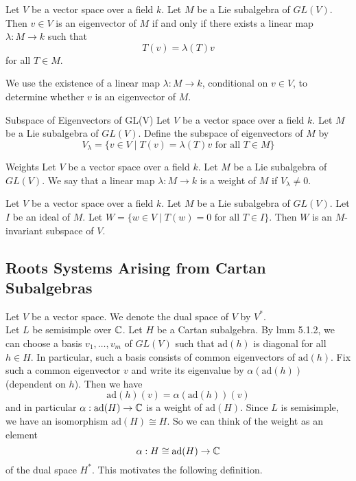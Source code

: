 \documentclass[a4paper]{article}
\begin{document}
\begin{lmm}{}{} Let $V$ be a vector space over a field $k$. Let $M$ be a Lie subalgebra of $GL(V)$. Then $v\in V$ is an eigenvector of $M$ if and only if there exists a linear map $\lambda:M\to k$ such that $$T(v)=\lambda(T)v$$ for all $T\in M$. 
\end{lmm}

We use the existence of a linear map $\lambda:M\to k$, conditional on $v\in V$, to determine whether $v$ is an eigenvector of $M$. 

\begin{defn}{Subspace of Eigenvectors of GL(V)}{} Let $V$ be a vector space over a field $k$. Let $M$ be a Lie subalgebra of $GL(V)$. Define the subspace of eigenvectors of $M$ by $$V_\lambda=\{v\in V\;|\;T(v)=\lambda(T)v\text{ for all }T\in M\}$$
\end{defn}

\begin{defn}{Weights}{} Let $V$ be a vector space over a field $k$. Let $M$ be a Lie subalgebra of $GL(V)$. We say that a linear map $\lambda:M\to k$ is a weight of $M$ if $V_\lambda\neq 0$. 
\end{defn}

\begin{lmm}{}{} Let $V$ be a vector space over a field $k$. Let $M$ be a Lie subalgebra of $GL(V)$. Let $I$ be an ideal of $M$. Let $W=\{w\in V\;|\;T(w)=0\text{ for all }T\in I\}$. Then $W$ is an $M$-invariant subspace of $V$. 
\end{lmm}

\subsection{Roots Systems Arising from Cartan Subalgebras}
Let $V$ be a vector space. We denote the dual space of $V$ by $V^\ast$. \\

Let $L$ be semisimple over $\mathbb{C}$. Let $H$ be a Cartan subalgebra. By lmm 5.1.2, we can choose a basis $v_1,\dots,v_m$ of $GL(V)$ such that $\text{ad}(h)$ is diagonal for all $h\in H$. In particular, such a basis consists of common eigenvectors of $\text{ad}(h)$. Fix such a common eigenvector $v$ and write its eigenvalue by $\alpha(\text{ad}(h))$ (dependent on $h$). Then we have $$\text{ad}(h)(v)=\alpha(\text{ad}(h))(v)$$ and in particular $\alpha:\text{ad}(H)\to\mathbb{C}$ is a weight of $\text{ad}(H)$. Since $L$ is semisimple, we have an isomorphism $\text{ad}(H)\cong H$. So we can think of the weight as an element $$\alpha:H\cong\text{ad}(H)\to\mathbb{C}$$ of the dual space $H^\ast$. This motivates the following definition. 
\end{document}
